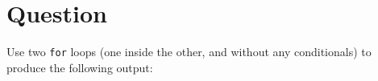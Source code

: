 \newpage

\section{Question}

Use two \texttt{for} loops (one inside the other, and without any
conditionals) to produce the following output:

\inputminted[label=Output]{text}{\docCodeDir/.control-1.gen.output.gen.section.all}

\newpage

